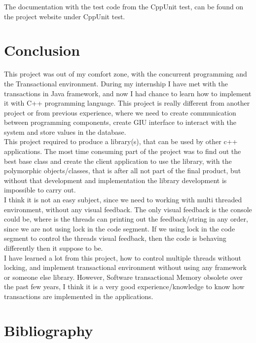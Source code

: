 \documentclass[12pt]{article}
\begin{document}
The documentation with the test code from the CppUnit test, can be found on the project website under CppUnit test.
\section{Conclusion}
This project was out of my comfort zone, with the concurrent programming and the Transactional environment. During my internship I have met with the transactions in Java framework, and now I had chance to learn how to implement it with C++ programming language. This project is really different from another project or from previous experience, where we need to create communication between programming components, create GIU interface to interact with the system and store values in the database.\\

This project required to produce a library(s), that can be used by other c++ applications. The most time consuming part of the project was to find out the best base class and create the client application to use the library, with the polymorphic objects/classes, that is after all not part of the final product, but without that development and implementation the library development is impossible to carry out.\\

I think it is not an easy subject, since we need to working with multi threaded environment, without any visual feedback. The only visual feedback is the console could be, where is the threads can printing out the feedback/string in any order, since we are not using lock in the code segment. If we using lock in the code segment to control the threads visual feedback, then the code is behaving differently then it suppose to be.\\ 

I have learned a lot from this project, how to control multiple threads without locking, and implement transactional environment without using any framework or someone else library. However, Software transactional Memory obsolete over the past few years, I think it is a very good experience/knowledge to know how transactions are implemented in the applications.
\newpage
\section{Bibliography}
\begin{center}



\end{center}
\end{document}
